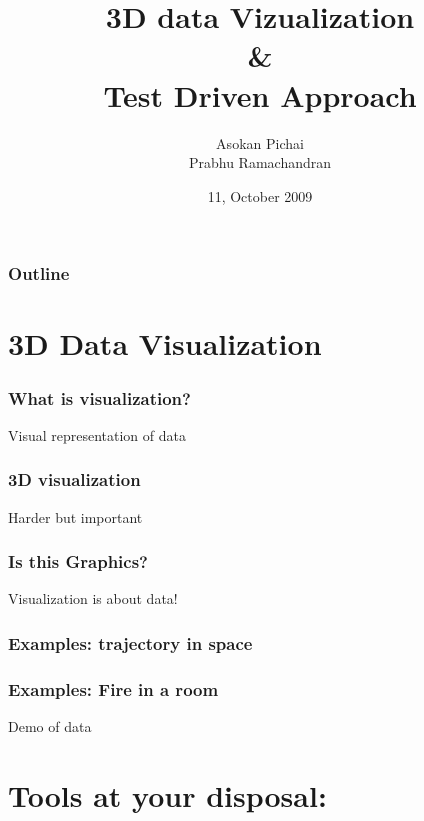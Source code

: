 \documentclass[compress,14pt]{beamer}
\title[]{3D data Vizualization\\ \& \\Test Driven Approach}
\author[FOSSEE Team] {Asokan Pichai\\Prabhu Ramachandran}
\institute[FOSSEE] {FOSSEE Team}
\date[] {11, October 2009}
\date[] %
\newcounter{time}
\newcommand{\inctime}[1]{\addtocounter{time}{#1}{\vspace*{0.1in}\tiny \thetime\ m}}
\begin{document}
\begin{frame}
  \maketitle
\end{frame}

\begin{frame}
  \frametitle{Outline}
  \Large
  \tableofcontents
\end{frame}

\section{3D Data Visualization}

\begin{frame}
    \frametitle{What is visualization?}
    \Large
    \begin{center}
    Visual representation of data
    \end{center}
\end{frame}

\begin{frame}
    \frametitle{3D visualization}
    \Large
    \begin{center}
        Harder but important
    \end{center}
\end{frame}

\begin{frame}
    \frametitle{Is this Graphics?}
    \Large
    \begin{center}
        Visualization is about data!
    \end{center}
\end{frame}

\begin{frame}
    \frametitle{Examples: trajectory in space}
    \Large
    \begin{center}
    \end{center}
\end{frame}

\begin{frame}
    \frametitle{Examples: Fire in a room}
    \Large
    \begin{center}
        Demo of data
    \end{center}
\inctime{10}
\end{frame}

\section{Tools at your disposal:}
\end{document}
